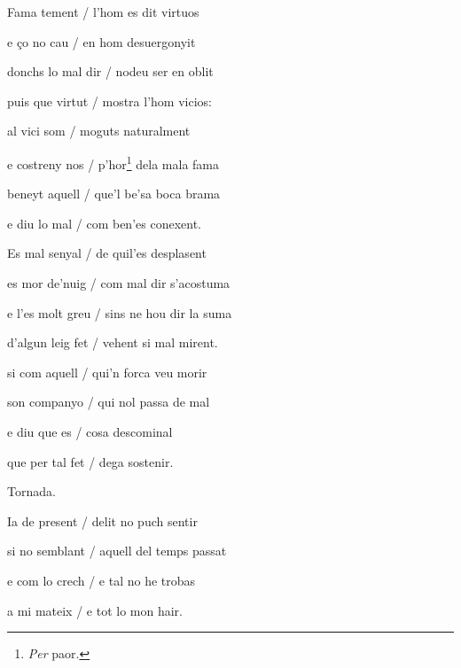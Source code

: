 \documentclass[12pt]{article}
\begin{document}
\begin{estrofa}

 Fama tement / l'hom es dit virtuos

 e \c{c}o no cau / en hom desuergonyit

 donchs lo mal dir / nodeu ser en oblit

 puis que virtut / mostra l'hom vicios:

 al vici som / moguts naturalment

 e costreny nos / p'hor\footnote{\textit{Per} paor.} dela mala fama

 beneyt aquell / que'l be'sa boca brama

 e diu lo mal / com ben'es conexent.

\end{estrofa}



\begin{estrofa}

 Es mal senyal / de quil'es desplasent

 es mor de'nuig / com mal dir s'acostuma

 e l'es molt greu / sins ne hou dir la suma

 d'algun leig fet / vehent si mal mirent.

 si com aquell / qui'n forca veu morir

 son companyo / qui nol passa de mal

 e diu que es / cosa descominal

 que per tal fet / dega sostenir.

\end{estrofa}


\begin{estrofaExtra}%




\begin{tornada}

Tornada.

\end{tornada}


\end{estrofaExtra}


\begin{estrofa}

 Ia de present / delit no puch sentir

 si no semblant / aquell del temps passat

 e com lo crech / e tal no he trobas

 a mi mateix / e tot lo mon hair.

\end{estrofa}
\end{document}

